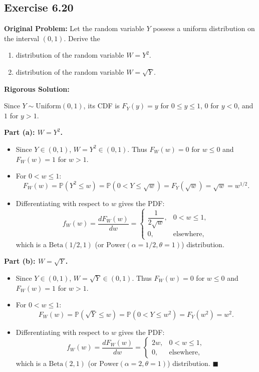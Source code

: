 \documentclass[11pt, letterpaper]{article}
\theoremstyle{definition}
\theoremstyle{remark}
\newcommand{\Prob}{\mathbb{P}}
\begin{document}
\subsection{Exercise 6.20}

\textbf{Original Problem:}
Let the random variable $Y$ possess a uniform distribution on the interval $(0, 1)$. Derive the
\begin{enumerate}[label=\textbf{\alph*}]
    \item distribution of the random variable $W = Y^2$.
    \item distribution of the random variable $W = \sqrt{Y}$.
\end{enumerate}

\hrulefill

\textbf{Rigorous Solution:}

Since $Y \sim \text{Uniform}(0, 1)$, its CDF is $F_Y(y) = y$ for $0 \le y \le 1$, $0$ for $y < 0$, and $1$ for $y > 1$.

\textbf{Part (a): $W = Y^2$.}
\begin{itemize}
    \item Since $Y \in (0, 1)$, $W = Y^2 \in (0, 1)$. Thus $F_W(w) = 0$ for $w \le 0$ and $F_W(w) = 1$ for $w > 1$.
    \item For $0 < w \le 1$:
    \[
        F_W(w) = \Prob(Y^2 \le w) = \Prob(0 < Y \le \sqrt{w}) = F_Y(\sqrt{w}) = \sqrt{w} = w^{1/2}.
    \]
    \item Differentiating with respect to $w$ gives the PDF:
    \[
        f_W(w) = \frac{dF_W(w)}{dw} = \begin{cases} \dfrac{1}{2\sqrt{w}}, & 0 < w \le 1, \\[6pt] 0, & \text{elsewhere,} \end{cases}
    \]
    which is a $\text{Beta}(1/2, 1)$ (or $\text{Power}(\alpha = 1/2, \theta = 1)$) distribution.
\end{itemize}

\textbf{Part (b): $W = \sqrt{Y}$.}
\begin{itemize}
    \item Since $Y \in (0, 1)$, $W = \sqrt{Y} \in (0, 1)$. Thus $F_W(w) = 0$ for $w \le 0$ and $F_W(w) = 1$ for $w > 1$.
    \item For $0 < w \le 1$:
    \[
        F_W(w) = \Prob(\sqrt{Y} \le w) = \Prob(0 < Y \le w^2) = F_Y(w^2) = w^2.
    \]
    \item Differentiating with respect to $w$ gives the PDF:
    \[
        f_W(w) = \frac{dF_W(w)}{dw} = \begin{cases} 2w, & 0 < w \le 1, \\ 0, & \text{elsewhere,} \end{cases}
    \]
    which is a $\text{Beta}(2, 1)$ (or $\text{Power}(\alpha = 2, \theta = 1)$) distribution. \hfill $\blacksquare$
\end{itemize}
\end{document}
